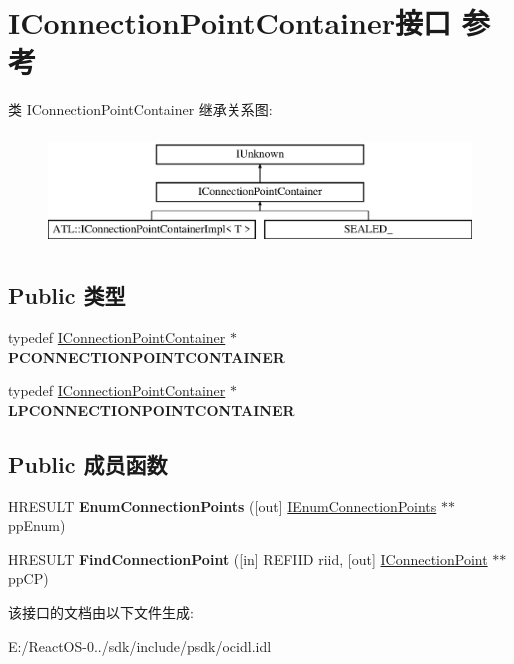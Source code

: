 \hypertarget{interface_i_connection_point_container}{}\section{I\+Connection\+Point\+Container接口 参考}
\label{interface_i_connection_point_container}
类 I\+Connection\+Point\+Container 继承关系图\+:\begin{figure}[H]
\begin{center}
\leavevmode
\includegraphics[height=3.000000cm]{interface_i_connection_point_container}
\end{center}
\end{figure}
\subsection*{Public 类型}
\begin{DoxyCompactItemize}
\item 
\mbox{\label{interface_i_connection_point_container_a00bc03d1d56122b2e14c607ed736021a}} 
typedef \hyperlink{interface_i_connection_point_container}{I\+Connection\+Point\+Container} $\ast$ {\bfseries P\+C\+O\+N\+N\+E\+C\+T\+I\+O\+N\+P\+O\+I\+N\+T\+C\+O\+N\+T\+A\+I\+N\+ER}
\item 
\mbox{\label{interface_i_connection_point_container_a5da0b8f98feb96e770db65c6d02a051e}} 
typedef \hyperlink{interface_i_connection_point_container}{I\+Connection\+Point\+Container} $\ast$ {\bfseries L\+P\+C\+O\+N\+N\+E\+C\+T\+I\+O\+N\+P\+O\+I\+N\+T\+C\+O\+N\+T\+A\+I\+N\+ER}
\end{DoxyCompactItemize}
\subsection*{Public 成员函数}
\begin{DoxyCompactItemize}
\item 
\mbox{\label{interface_i_connection_point_container_a7555f05f2193597b4d4e663b32a205d8}} 
H\+R\+E\+S\+U\+LT {\bfseries Enum\+Connection\+Points} (\mbox{[}out\mbox{]} \hyperlink{interface_i_enum_connection_points}{I\+Enum\+Connection\+Points} $\ast$$\ast$pp\+Enum)
\item 
\mbox{\label{interface_i_connection_point_container_ac2cd74b16647310740cc040cfb00b7e6}} 
H\+R\+E\+S\+U\+LT {\bfseries Find\+Connection\+Point} (\mbox{[}in\mbox{]} R\+E\+F\+I\+ID riid, \mbox{[}out\mbox{]} \hyperlink{interface_i_connection_point}{I\+Connection\+Point} $\ast$$\ast$pp\+CP)
\end{DoxyCompactItemize}


该接口的文档由以下文件生成\+:\begin{DoxyCompactItemize}
\item 
E\+:/\+React\+O\+S-\/0../sdk/include/psdk/ocidl.\+idl\end{DoxyCompactItemize}
